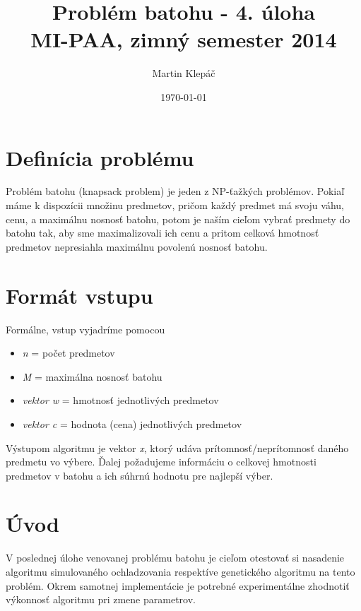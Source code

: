 \documentclass[slovak]{article}
\begin{document}
\title{Problém batohu - 4. úloha \\[5mm] MI-PAA, zimný semester 2014}
\author{Martin Klepáč}
\date{\today}

\maketitle

\section{Definícia problému}

Problém batohu (knapsack problem) je jeden z NP-ťažkých problémov. Pokiaľ máme k dispozícii množinu predmetov, pričom každý predmet má svoju váhu, cenu, a maximálnu nosnosť batohu, potom je naším cieľom vybrať predmety do batohu tak, aby sme maximalizovali ich cenu a pritom celková hmotnosť predmetov nepresiahla maximálnu povolenú nosnosť batohu.

\section{Formát vstupu}

Formálne, vstup vyjadríme pomocou

\begin{itemize}

\item \emph{n} = počet predmetov

\item \emph{M} = maximálna nosnosť batohu

\item \emph{vektor w} = hmotnosť jednotlivých predmetov

\item \emph{vektor c} = hodnota (cena) jednotlivých predmetov

\end{itemize}

Výstupom algoritmu je vektor \emph{x}, ktorý udáva prítomnosť/neprítomnosť daného predmetu vo výbere. Ďalej požadujeme informáciu o celkovej hmotnosti predmetov v batohu a ich súhrnú hodnotu pre najlepší výber.


\section{Úvod}

V poslednej úlohe venovanej problému batohu je cieľom otestovať si nasadenie algoritmu simulovaného ochladzovania respektíve genetického algoritmu na tento problém. Okrem samotnej implementácie je potrebné experimentálne zhodnotiť výkonnosť algoritmu pri zmene parametrov.
\end{document}
